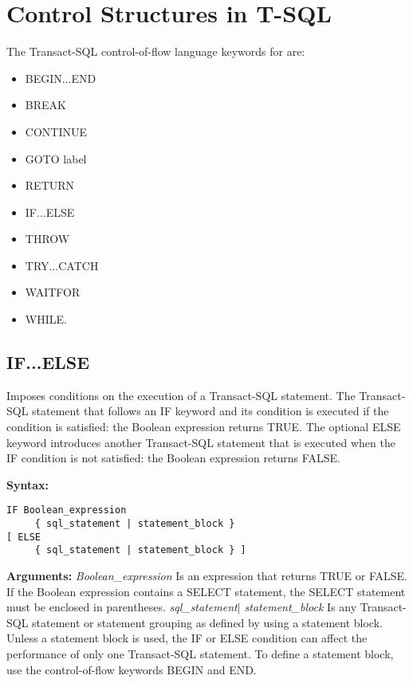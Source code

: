 \section{Control Structures in T-SQL}

The Transact-SQL control-of-flow language keywords for are:
\begin{itemize}
  \item BEGIN...END
  \item BREAK	
  \item CONTINUE	
  \item GOTO label	
  \item RETURN
  \item IF...ELSE
  \item THROW
  \item TRY...CATCH
  \item WAITFOR
  \item WHILE.
\end{itemize}

\subsection{IF...ELSE}
Imposes conditions on the execution of a Transact-SQL statement. The Transact-SQL statement that follows an IF keyword and its condition is executed if the condition is satisfied: the Boolean expression returns TRUE. The optional ELSE keyword introduces another Transact-SQL statement that is executed when the IF condition is not satisfied: the Boolean expression returns FALSE.\newline

\textbf{Syntax:}
\begin{verbatim}
IF Boolean_expression   
     { sql_statement | statement_block }   
[ ELSE   
     { sql_statement | statement_block } ]   
\end{verbatim}

\textbf{Arguments:}\newline
\textit{Boolean\_expression}\newline
Is an expression that returns TRUE or FALSE. If the Boolean expression contains a SELECT statement, the SELECT statement must be enclosed in parentheses.\newline
\textit{{ sql\_statement$\mid$ statement\_block }}\newline
Is any Transact-SQL statement or statement grouping as defined by using a statement block. Unless a statement block is used, the IF or ELSE condition can affect the performance of only one Transact-SQL statement.
To define a statement block, use the control-of-flow keywords BEGIN and END.

